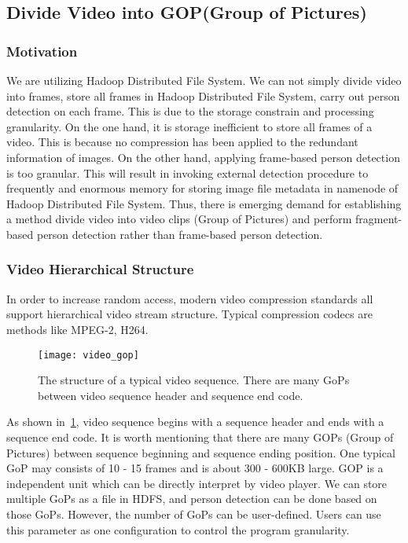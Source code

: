 \subsection{Divide Video into GOP(Group of Pictures)}
\subsubsection{Motivation}
We are utilizing Hadoop Distributed File System. We can not simply divide video
into frames, store all frames in Hadoop Distributed File System, carry out
person detection on each frame. This is due to the storage constrain and
processing granularity. On the one hand, it is storage inefficient to store all 
frames of a video. This is because no compression has been applied to the
redundant information of images. On the other hand, applying frame-based person 
detection is too granular. This will result in invoking external detection
procedure to frequently and enormous memory for storing image file metadata in 
namenode of Hadoop Distributed File System. Thus, there is emerging demand for 
establishing a method divide video into video clips (Group of Pictures) and
perform fragment-based person detection rather than frame-based person detection.

\subsubsection{Video Hierarchical Structure}
In order to increase random access, modern video compression standards all
support hierarchical video stream structure. Typical compression codecs are  
methods like MPEG-2, H264.

\begin{figure}[!htbp]
  \centering
  \begin{minipage}{1.0\columnwidth}
  \texttt{[image: video\_gop]}
  \end{minipage}
  
  \vspace{-1ex}
  \caption
    {
    \small
    The structure of a typical video sequence. There are many GoPs between video
    sequence header and sequence end code.}
  \label{fig:video_gop}
\end{figure}

As shown in~\fig\ref{fig:video_gop}, video sequence begins with a sequence
header and ends with a sequence end code. It is worth mentioning that there are
many GOPs (Group of Pictures) between sequence beginning and sequence ending 
position. One typical GoP may consists of 10 - 15 frames and is about 300 -
600KB large.
GOP is a independent unit which can be directly interpret by video player. We
can store multiple GoPs as a file in HDFS, and person detection can be done
based on those GoPs. However, the number of GoPs can be user-defined. Users can
use this parameter as one configuration to control the program granularity.

